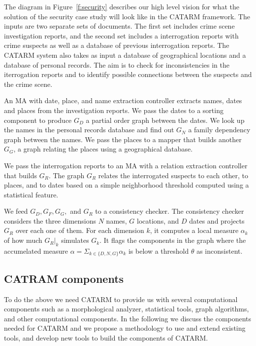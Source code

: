 \documentclass[12pt]{article}
\begin{document}
The diagram in Figure~\ref{f:security} describes our 
high level vision for what the solution of the 
security case study
will look like in the CATARM framework. 
The inputs are two separate sets of documents. 
The first set includes crime scene investigation reports, 
and the second set includes a 
interrogation reports with crime suspects as well as 
a database of previous interrogation reports. 
The CATARM system also takes as input a database of geographical
locations and a database of personal records. 
The aim is to check for inconsistencies in the iterrogation
reports and to identify possible connections between the suspects
and the crime scene. 

An MA with date, place, and name extraction controller extracts
names, dates and places from the investigation reports. 
We pass the dates to a sorting component to produce $G_D$ 
a partial order graph between the dates. 
We look up the names in the personal records database and find out
$G_N$ a family dependency graph between the names. 
We pass the places to a mapper that builds another $G_G$,
a graph relating the places using a geographical database. 

We pass the interrogation reports to an MA with a relation 
extraction controller that builds $G_R$. 
The graph $G_R$ relates the interrogated suspects
to each other, to places, and to dates based on a simple
neighborhood threshold computed using a statistical feature. 

We feed $G_D, G_F, G_G,$ and $G_R$   
to a consistency checker.
The consistency checker considers the three dimensions 
$N$ names, $G$ locations, and $D$ dates and projects $G_R$
over each one of them.
For each dimension $k$, it computes a local measure 
$\alpha_k$ of how much $G_R|_k$ simulates $G_k$. 
It flags the components in the graph where the accumelated 
measure $\alpha= \Sigma_{k\in\{D,N,G\}} \alpha_k$ is
below a threshold $\theta$ as inconsistent. 

\subsection{CATRAM components}
\label{s:design:components}

To do the above we need CATARM to provide us with several 
computational components such as a morphological analyzer, 
statistical tools, graph algorithms, and other computational
components. 
In the following we discuss the components needed for 
CATARM and we propose a methodology to 
use and extend existing tools, and develop new tools to
build the components of CATARM.
\end{document}
